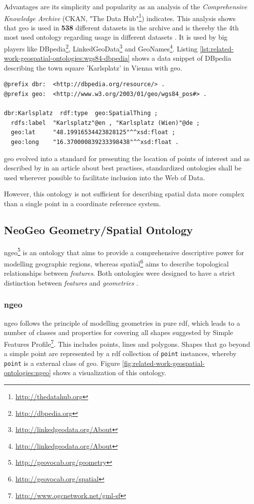 \documentclass[draft,final]{vutinfth} %
\begin{document}
Advantages are its simplicity and popularity as an analysis of the \textit{Comprehensive Knowledge Archive} (CKAN, "The Data Hub"\footnote{\url{http://thedatahub.org}}) indicates. This analysis shows that \gls{geo} is used in \textbf{538} different datasets in the archive and is thereby the 4th most used ontology regarding usage in different datasets \cite{research_group:_akws_lodstats_????}. It is used by big players like DBpedia\footnote{\url{http://dbpedia.org}}, LinkedGeoData\footnote{\url{http://linkedgeodata.org/About}} and GeoNames\footnote{\url{http://linkedgeodata.org/About}}. 
Listing \ref{lst:related-work-geospatial-ontologies:wgs84-dbpedia} shows a data snippet of DBpedia describing the town square 'Karlsplatz' in Vienna with \gls{geo}.

\begin{lstlisting}[frame=single, caption=Snippet of DBpedia, label={lst:related-work-geospatial-ontologies:wgs84-dbpedia}]
@prefix dbr:  <http://dbpedia.org/resource/> .
@prefix geo:  <http://www.w3.org/2003/01/geo/wgs84_pos#> .

dbr:Karlsplatz  rdf:type  geo:SpatialThing ;
  rdfs:label  "Karlsplatz"@en , "Karlsplatz (Wien)"@de ;
  geo:lat     "48.19916534423828125"^^xsd:float ;
  geo:long    "16.370000839233398438"^^xsd:float .
\end{lstlisting}

\gls{geo} evolved into a standard for presenting the location of points of interest and as described by \cite{hyland_best_2014} in an article about best practises, standardized ontologies shall be used wherever possible to facilitate
inclusion into the Web of Data.

However, this ontology is not sufficient for describing spatial data more complex than a single point in a coordinate reference system.

\subsection{NeoGeo Geometry/Spatial Ontology}
\gls{ngeo}\footnote{\url{http://geovocab.org/geometry}} is an ontology that aims to provide a comprehensive descriptive power for modelling geographic regions, whereas \gls{spatial}\footnote{\url{http://geovocab.org/spatial}} aims to describe topological relationships between \textit{features}. Both ontologies were designed to have a strict distinction between \textit{features} and \textit{geometries} \cite{norton_neogeo_2012}.

\subsubsection{\gls{ngeo}} 
\gls{ngeo} follows the principle of modelling geometries in pure \gls{rdf}, which leads to a number of classes and properties for covering all shapes suggested by Simple Features Profile\footnote{\url{http://www.ogcnetwork.net/gml-sf}}. This includes points, lines and polygons. Shapes that go beyond a simple point are represented by a \gls{rdf} collection of \texttt{point} instances, whereby \texttt{point} is a external class of \gls{geo}. Figure \ref{fig:related-work-geospatial-ontologies:ngeo} shows a visualization of this ontology.
\end{document}
